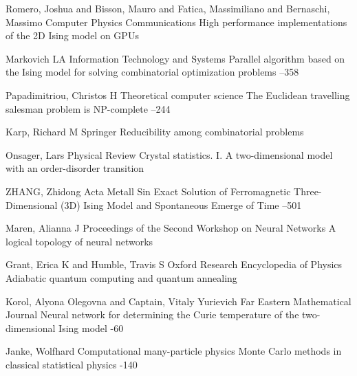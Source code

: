 \documentclass[10pt]{article}
\begin{document}
	
	\begin{thebibliography}{20}
		\setlength{\parsep}{0pt}\setlength{\itemsep}{3pt}
		
		\by Romero, Joshua and Bisson, Mauro and Fatica, Massimiliano and Bernaschi, Massimo
		\jour Computer Physics Communications
		\paper High performance implementations of the 2D Ising model on GPUs
		
		\by Markovich LA
		\jour Information Technology and Systems
		\paper Parallel algorithm based on the Ising model for solving combinatorial optimization problems
		--358
		
		\by Papadimitriou, Christos H
		\jour Theoretical computer science
		\paper The Euclidean travelling salesman problem is NP-complete
		--244
		
		\by Karp, Richard M
		\jour Springer
		\paper Reducibility among combinatorial problems
		
		\by Onsager, Lars
		\jour Physical Review
		\paper Crystal statistics. I. A two-dimensional model with an order-disorder transition
		
		\by ZHANG, Zhidong
		\jour Acta Metall Sin
		\paper Exact Solution of Ferromagnetic Three-Dimensional (3D) Ising Model and Spontaneous Emerge of Time
		--501
		
		\by Maren, Alianna J
		\jour Proceedings of the Second Workshop on Neural Networks
		\paper A logical topology of neural networks
		
		\by Grant, Erica K and Humble, Travis S
		\jour Oxford Research Encyclopedia of Physics
		\paper Adiabatic quantum computing and quantum annealing
		
		\by Korol, Alyona Olegovna and Captain, Vitaly Yurievich
		\jour Far Eastern Mathematical Journal
		\paper Neural network for determining the Curie temperature of the two-dimensional Ising model
		-60
		
		\by Janke, Wolfhard
		\jour Computational many-particle physics
		\paper Monte Carlo methods in classical statistical physics
		-140
		

\end{thebibliography}
\end{document}
